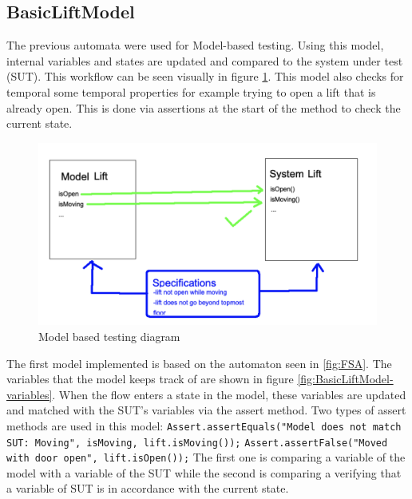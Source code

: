 \documentclass[a4paper, 12pt]{article}
\begin{document}
\subsection{BasicLiftModel}
The previous automata were used for Model-based testing. Using this model, internal variables and states are updated and compared to the system under test (SUT). This workflow can be seen visually in figure \ref{fig:model-based-testing-diag}. This model  also checks for temporal some temporal properties for example trying to open a lift that is already open. This is done via  assertions at the start of the method to check the current state. \\

\begin{figure}
   \centering
   \includegraphics[width=\textwidth,height=\textheight,keepaspectratio]{images/model-based-testing-diag} %
   \caption{Model based testing diagram}
   \label{fig:model-based-testing-diag}
\end{figure}

The first model implemented is based on the automaton seen in \ref{fig:FSA}. The variables that the model keeps track of are shown in figure \ref{fig:BasicLiftModel-variables}. When the flow enters a state in the model, these variables are updated and matched with the SUT's variables via the assert method. Two types of assert methods are used in this model: \newline
\texttt{Assert.assertEquals("Model does not match SUT: Moving", isMoving, lift.isMoving());} \newline
\texttt{Assert.assertFalse("Moved with door open", lift.isOpen());}
The first one is comparing a variable of the model with a variable of the SUT while the second is comparing a verifying that a variable of SUT is in accordance with the current state.\\ 
\end{document}
